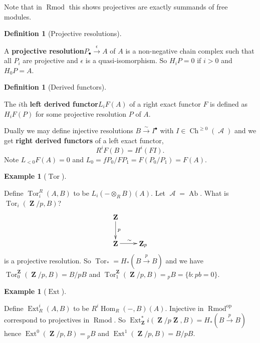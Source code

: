 \documentclass[10pt,]{book}
\newcommand{\lt}{<}
\newcommand{\gt}{>}
\newcommand{\terminology}[1]{\textbf{#1}}
\theoremstyle{plain}
\theoremstyle{definition}
\newtheorem{definition}[theorem]{Definition}
\newtheorem{example}[theorem]{Example}
\numberwithin{equation}{section}
\DeclareMathOperator{\Hom}{Hom}
\DeclareMathOperator{\Tor}{Tor}
\DeclareMathOperator{\Ext}{Ext}
\DeclareMathOperator{\op}{op}
\DeclareMathOperator{\Ch}{Ch}
\DeclareMathOperator{\Ab}{\text{Ab}}
\DeclareMathOperator{\Rmod}{R\text{mod}}
\DeclareMathOperator{\cA}{\mathcal{A}}
\DeclareMathOperator{\ZZ}{\mathbf{Z}}
\begin{document}
          Note that in \(\Rmod\) this shows projectives are exactly summands of free modules.
          
\begin{definition}[Projective resolutions]\label{definition-18}

            A \terminology{projective resolution}\(P_\bullet \xrightarrow{\epsilon} A\) of \(A\) is a non-negative chain complex such that all \(P_i\) are projective and \(\epsilon\) is a quasi-isomorphism.
            So \(H_i P = 0\) if \(i \gt 0\) and \(H_0 P = A\).
          \end{definition}
\begin{definition}[Derived functors]\label{definition-19}

            The \(i\)th \terminology{left derived functor}\(L_i F(A)\) of a right exact functor \(F\) is defined as \(H_iF(P)\) for some projective resolution \(P\) of \(A\).\newline{}\end{definition}
\par

          Dually we may define injective resolutions \(B \xrightarrow{\sim} I^\bullet\) with \(I \in \Ch^{\ge 0}(\cA)\) and we get \terminology{right derived functors} of a left exact functor,
          \[
            R^i F(B) = H^i (FI ).
          \]
          Note \(L_{\lt 0} F(A) = 0\) and \(L_0= fP_0 / FP_1 = F(P_0/P_1) = F(A)\).
\begin{example}[\(\Tor\)]\label{example-10}

            Define \(\Tor^R_i(A, B)\) to be \(L_i(- \otimes_R B)(A)\).
            Let \(\cA = \Ab\). What is \(\Tor_i(\ZZ/p , B)\)?
            \[
              \xymatrix{\ZZ\ar[d]^p &\\ \ZZ \ar[r]^{\sim} &\ZZ_p}
            \]
            is a projective resolution.
            So \(\Tor_* = H_*(B \xrightarrow{p} B)\) and we have \(\Tor^{\ZZ}_0 (\ZZ/p, B) = B/pB\) and \(\Tor^{\ZZ}_1(\ZZ/p, B) = {}_pB = \{b : pb = 0\}\).
          \end{example}
\begin{example}[\(\Ext\)]\label{example-11}

            Define \(\Ext^i_R(A, B)\) to be \(R^i\Hom_R(-, B)(A)\).
            Injective in \(\Rmod^{\op}\) correspond to projectives in \(\Rmod\).
            So \(\Ext_{\ZZ}^*i(\ZZ/p\ZZ, B) = H_*(B \xrightarrow{p} B)\) hence \(\Ext^0 (\ZZ/p, B) = {}_pB\) and \(\Ext^1(\ZZ/p, B) = B/pB\).
          \end{example}
\typeout{************************************************}
\typeout{************************************************}
\end{document}
